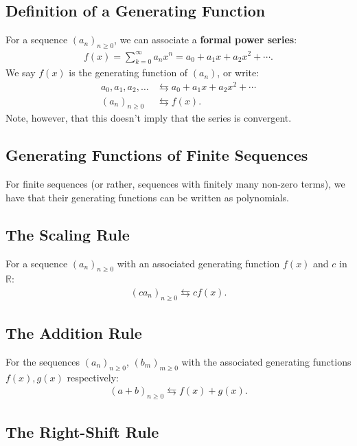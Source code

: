 \documentclass[a4paper, 12pt, twoside]{article}
\begin{document}
\subsection{Definition of a Generating Function}

For a sequence $(a_n)_{n \geq 0}$, we
can associate a \textbf{formal power series}: \begin{gather*}
  f(x) = \sum_{k = 0}^\infty a_nx^n = a_0 + a_1x + a_2x^2 + \cdots.
\end{gather*} We say $f(x)$ is the generating function of $(a_n)$,
or write: \begin{align*}
  a_0, a_1, a_2, \ldots &\leftrightarrows a_0 + a_1x + a_2x^2 + \cdots \\
  (a_n)_{n \geq 0} &\leftrightarrows f(x).
\end{align*} Note, however, that this doesn't imply that the series is convergent.

\subsection{Generating Functions of Finite Sequences}

For finite sequences (or rather, sequences with finitely many
non-zero terms), we have that their generating functions
can be written as polynomials.

\subsection{The Scaling Rule}

For a sequence $(a_n)_{n \geq 0}$ with an
associated generating function $f(x)$ and $c$ in $\mathbb{R}$: \begin{gather*}
  (ca_n)_{n \geq 0} \leftrightarrows cf(x).
\end{gather*}

\subsection{The Addition Rule}

For the sequences $(a_n)_{n \geq 0}$, $(b_m)_{m \geq 0}$ 
with the associated generating functions $f(x), g(x)$ respectively: \begin{gather*}
  (a + b)_{n \geq 0} \leftrightarrows f(x) + g(x).
\end{gather*}

\subsection{The Right-Shift Rule}
\end{document}
